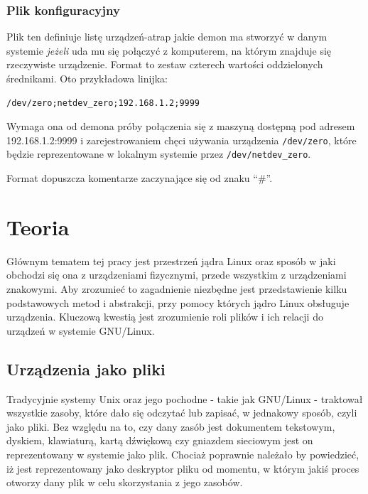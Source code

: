 \documentclass[11pt]{scrartcl}
\let\stdsection\section
\renewcommand\section{\newpage\stdsection}
\begin{document}
\subsubsection{Plik konfiguracyjny}

Plik ten definiuje listę urządzeń-atrap jakie demon ma stworzyć w danym systemie \textit{jeżeli} uda mu się połączyć z komputerem, na którym znajduje się rzeczywiste urządzenie. Format to zestaw czterech wartości oddzielonych średnikami. Oto przykładowa linijka:

\begin{verbatim}
/dev/zero;netdev_zero;192.168.1.2;9999
\end{verbatim}

Wymaga ona od demona próby połączenia się z maszyną dostępną pod adresem 192.168.1.2:9999 i zarejestrowaniem chęci używania urządzenia \texttt{/dev/zero}, które będzie reprezentowane w lokalnym systemie przez \texttt{/dev/netdev\_zero}.

Format dopuszcza komentarze zaczynające się od znaku ``\#''.

\section{Teoria}
\label{theory}

Głównym tematem tej pracy jest przestrzeń jądra Linux oraz sposób w jaki obchodzi się ona z urządzeniami fizycznymi, przede wszystkim z urządzeniami znakowymi. Aby zrozumieć to zagadnienie niezbędne jest przedstawienie kilku podstawowych metod i abstrakcji, przy pomocy których jądro Linux obsługuje urządzenia. Kluczową kwestią jest zrozumienie roli plików i ich relacji do urządzeń w systemie GNU/Linux.

\subsection{Urządzenia jako pliki}
\label{devasfiles}

Tradycyjnie systemy Unix oraz jego pochodne - takie jak GNU/Linux - traktował wszystkie zasoby, które dało się odczytać lub zapisać, w jednakowy sposób, czyli jako pliki. Bez względu na to, czy dany zasób jest dokumentem tekstowym, dyskiem, klawiaturą, kartą dźwiękową czy gniazdem sieciowym jest on reprezentowany w systemie jako plik. Chociaż poprawnie należało by powiedzieć, iż jest reprezentowany jako deskryptor pliku od momentu, w którym jakiś proces otworzy dany plik w celu skorzystania z jego zasobów.
\end{document}
